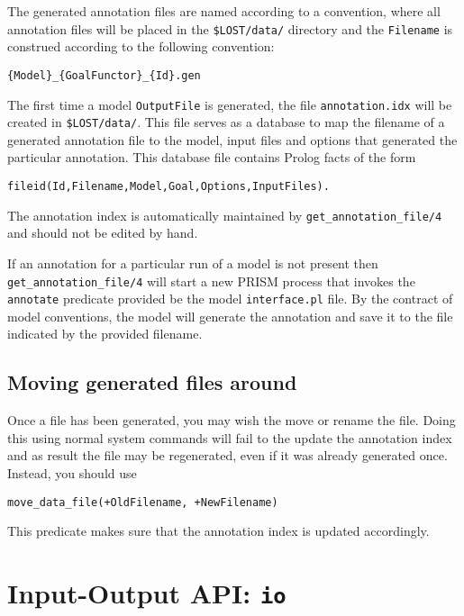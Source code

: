 \documentclass{book}
\begin{document}
The generated annotation files are named according to a convention, where 
all annotation files will be placed in the \texttt{\$LOST/data/}
directory and the \texttt{Filename} is construed according to the following convention:
\begin{verbatim}
{Model}_{GoalFunctor}_{Id}.gen
\end{verbatim}

The first time a model \texttt{OutputFile} is generated, the file
\texttt{annotation.idx} will be created in \texttt{\$LOST/data/}. This file
serves as a database to map the filename of a generated annotation
file to the model, input files and options that generated
the particular annotation. This database file contains Prolog facts 
of the form
\begin{verbatim}
fileid(Id,Filename,Model,Goal,Options,InputFiles).
\end{verbatim}

The annotation index is automatically maintained by
\texttt{get\_annotation\_file/4} and should not be edited by hand.

If an annotation for a particular run of a model is not present then
\texttt{get\_annotation\_file/4} will start a new PRISM process 
that invokes the \texttt{annotate} predicate provided
be the model \texttt{interface.pl} file. By the contract of model 
conventions, the model will generate the annotation and save it 
to the file indicated by the provided filename.

\subsection{Moving generated files around}

Once a file has been generated, you may wish the move or rename the
file. Doing this using normal system commands will fail to the update 
the annotation index and as result the file may be regenerated, even 
if it was already generated once.  Instead, you should use

\begin{verbatim}
move_data_file(+OldFilename, +NewFilename)
\end{verbatim}
\noindent
This predicate makes sure that the annotation index is updated accordingly.

\section{Input-Output API: \texttt{io}}
\label{sec:io}
\end{document}
